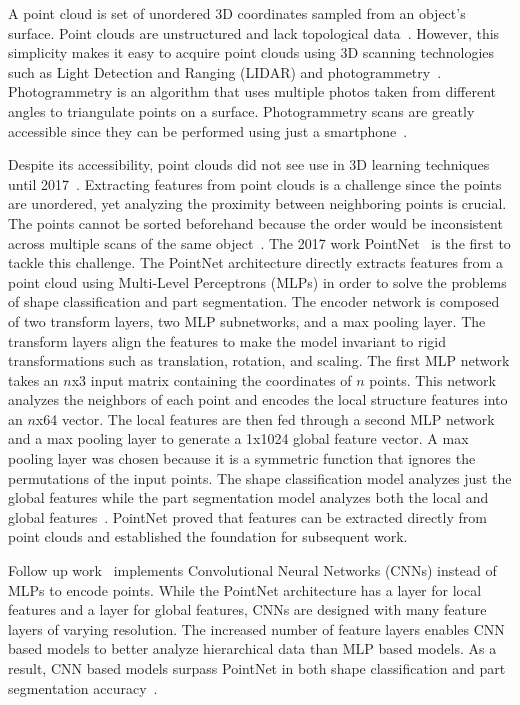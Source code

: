 A point cloud is set of unordered 3D coordinates sampled from an object's surface. Point clouds are unstructured and lack topological data~\cite{Xiao2020}. However, this simplicity makes it easy to acquire point clouds using 3D scanning technologies such as Light Detection and Ranging (LIDAR) and photogrammetry~\cite{Leberl2010}. Photogrammetry is an algorithm that uses multiple photos taken from different angles to triangulate points on a surface. Photogrammetry scans are greatly accessible since they can be performed using just a smartphone~\cite{Micheletti2015}.

Despite its accessibility, point clouds did not see use in 3D learning techniques until 2017~\cite{Xiao2020}. Extracting features from point clouds is a challenge since the points are unordered, yet analyzing the proximity between neighboring points is crucial. The points cannot be sorted beforehand because the order would be inconsistent across multiple scans of the same object~\cite{Qi2017}. The 2017 work PointNet~\cite{Qi2017} is the first to tackle this challenge. The PointNet architecture directly extracts features from a point cloud using Multi-Level Perceptrons (MLPs) in order to solve the problems of shape classification and part segmentation. The encoder network is composed of two transform layers, two MLP subnetworks, and a max pooling layer. The transform layers align the features to make the model invariant to rigid transformations such as translation, rotation, and scaling. The first MLP network takes an $n$x3 input matrix containing the coordinates of $n$ points. This network analyzes the neighbors of each point and encodes the local structure features into an $n$x64 vector. The local features are then fed through a second MLP network and a max pooling layer to generate a 1x1024 global feature vector. A max pooling layer was chosen because it is a symmetric function that ignores the permutations of the input points. The shape classification model analyzes just the global features while the part segmentation model analyzes both the local and global features~\cite{Qi2017}. PointNet proved that features can be extracted directly from point clouds and established the foundation for subsequent work.

Follow up work~\cite{Xu2018, Li2018, Wu2019} implements Convolutional Neural Networks (CNNs) instead of MLPs to encode points. While the PointNet architecture has a layer for local features and a layer for global features, CNNs are designed with many feature layers of varying resolution. The increased number of feature layers enables CNN based models to better analyze hierarchical data than MLP based models. As a result, CNN based models surpass PointNet in both shape classification and part segmentation accuracy~\cite{Wu2019}.

